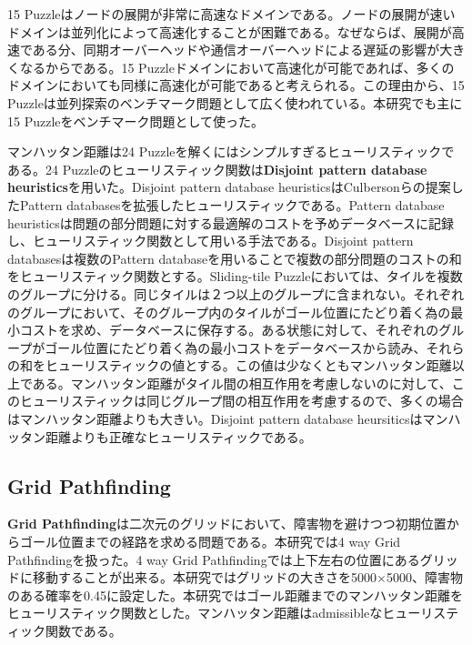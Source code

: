 \documentclass[uplatex]{jsarticle}
\begin{document}
15 Puzzleはノードの展開が非常に高速なドメインである。ノードの展開が速いドメインは並列化によって高速化することが困難である。なぜならば、展開が高速である分、同期オーバーヘッドや通信オーバーヘッドによる遅延の影響が大きくなるからである。15 Puzzleドメインにおいて高速化が可能であれば、多くのドメインにおいても同様に高速化が可能であると考えられる。この理由から、15 Puzzleは並列探索のベンチマーク問題として広く使われている。本研究でも主に15 Puzzleをベンチマーク問題として使った。
\newline

マンハッタン距離は24 Puzzleを解くにはシンプルすぎるヒューリスティックである。24 Puzzleのヒューリスティック関数は\textbf{Disjoint pattern database heuristics}を用いた\cite{Korf2002}。Disjoint pattern database heuristicsはCulbersonらの提案したPattern databasesを拡張したヒューリスティックである。Pattern database heuristicsは問題の部分問題に対する最適解のコストを予めデータベースに記録し、ヒューリスティック関数として用いる手法である\cite{Culberson1998pattern}。Disjoint pattern databasesは複数のPattern databaseを用いることで複数の部分問題のコストの和をヒューリスティック関数とする。Sliding-tile Puzzleにおいては、タイルを複数のグループに分ける。同じタイルは２つ以上のグループに含まれない。それぞれのグループにおいて、そのグループ内のタイルがゴール位置にたどり着く為の最小コストを求め、データベースに保存する。ある状態に対して、それぞれのグループがゴール位置にたどり着く為の最小コストをデータベースから読み、それらの和をヒューリスティックの値とする。この値は少なくともマンハッタン距離以上である。マンハッタン距離がタイル間の相互作用を考慮しないのに対して、このヒューリスティックは同じグループ間の相互作用を考慮するので、多くの場合はマンハッタン距離よりも大きい。Disjoint pattern database heursiticsはマンハッタン距離よりも正確なヒューリスティックである。


\subsection{Grid Pathfinding}

\textbf{Grid Pathfinding}は二次元のグリッドにおいて、障害物を避けつつ初期位置からゴール位置までの経路を求める問題である。本研究では4 way Grid Pathfindingを扱った。4 way Grid Pathfindingでは上下左右の位置にあるグリッドに移動することが出来る。本研究ではグリッドの大きさを5000$\times$5000、障害物のある確率を0.45に設定した。本研究ではゴール距離までのマンハッタン距離をヒューリスティック関数とした。マンハッタン距離はadmissibleなヒューリスティック関数である。
\end{document}
